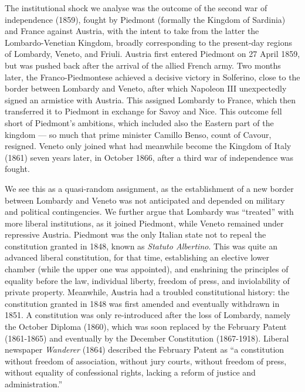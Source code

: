 The institutional shock we analyse was the outcome of the second war of independence (1859), fought by Piedmont (formally the Kingdom of Sardinia) and France against Austria, with the intent to take from the latter the Lombardo-Venetian Kingdom, broadly corresponding to the present-day regions of Lombardy, Veneto, and Friuli. Austria first entered Piedmont on 27 April 1859, but was pushed back after the arrival of the allied French army. Two months later, the Franco-Piedmontese achieved a decisive victory in Solferino, close to the border between Lombardy and Veneto, after which Napoleon III unexpectedly signed an armistice with Austria. This assigned Lombardy to France, which then transferred it to Piedmont in exchange for Savoy and Nice. This outcome fell short of Piedmont's ambitions, which included also the Eastern part of the kingdom --- so much that prime minister Camillo Benso, count of Cavour, resigned. Veneto only joined what had meanwhile become the Kingdom of Italy (1861) seven years later, in October 1866, after a third war of independence was fought.

We see this as a quasi-random assignment, as the establishment of a new border between Lombardy and Veneto was not anticipated and depended on military and political contingencies. We further argue that Lombardy was ``treated'' with more liberal institutions, as it joined Piedmont, while Veneto remained under repressive Austria. Piedmont was the only Italian state not to repeal the constitution granted in 1848, known as \textit{Statuto Albertino}. This was quite an advanced liberal constitution,  for that time, establishing an elective lower chamber (while the upper one was appointed), and enshrining the principles of equality before the law, individual liberty, freedom of press, and inviolability of private property.
Meanwhile, Austria had a troubled constitutional history: the constitution granted in 1848 was first amended and eventually withdrawn in 1851. A constitution was only re-introduced after the loss of Lombardy, namely the October Diploma (1860), which was soon replaced by the February Patent (1861-1865) and eventually by the December Constitution (1867-1918). Liberal newspaper \textit{Wanderer} (1864) described the February Patent as  ``a constitution without freedom of association, without jury courts, without freedom of press, without equality of confessional rights, lacking a reform of justice and administration.”

